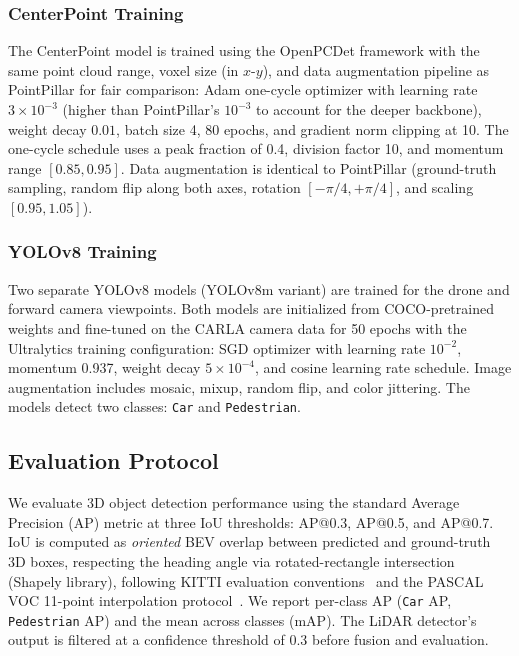 \documentclass[sustainability,article,submit,moreauthors,pdftex]{Definitions/mdpi}
\begin{document}
\subsubsection{CenterPoint Training}

The CenterPoint model is trained using the OpenPCDet framework with the same point cloud range, voxel size (in $x$-$y$), and data augmentation pipeline as PointPillar for fair comparison: Adam one-cycle optimizer with learning rate $3 \times 10^{-3}$ (higher than PointPillar's $10^{-3}$ to account for the deeper backbone), weight decay $0.01$, batch size 4, 80 epochs, and gradient norm clipping at 10. The one-cycle schedule uses a peak fraction of 0.4, division factor 10, and momentum range $[0.85, 0.95]$. Data augmentation is identical to PointPillar (ground-truth sampling, random flip along both axes, rotation $[-\pi/4, +\pi/4]$, and scaling $[0.95, 1.05]$).

\subsubsection{YOLOv8 Training}

Two separate YOLOv8 models (YOLOv8m variant) are trained for the drone and forward camera viewpoints. Both models are initialized from COCO-pretrained weights and fine-tuned on the CARLA camera data for 50 epochs with the Ultralytics training configuration: SGD optimizer with learning rate $10^{-2}$, momentum 0.937, weight decay $5 \times 10^{-4}$, and cosine learning rate schedule. Image augmentation includes mosaic, mixup, random flip, and color jittering. The models detect two classes: \texttt{Car} and \texttt{Pedestrian}.

\subsection{Evaluation Protocol}

We evaluate 3D object detection performance using the standard Average Precision (AP) metric at three IoU thresholds: AP@0.3, AP@0.5, and AP@0.7. IoU is computed as \emph{oriented} BEV overlap between predicted and ground-truth 3D boxes, respecting the heading angle via rotated-rectangle intersection (Shapely library), following KITTI evaluation conventions~\cite{geiger2012kitti} and the PASCAL VOC 11-point interpolation protocol~\cite{everingham2010voc}. We report per-class AP (\texttt{Car} AP, \texttt{Pedestrian} AP) and the mean across classes (mAP). The LiDAR detector's output is filtered at a confidence threshold of 0.3 before fusion and evaluation.
\end{document}
